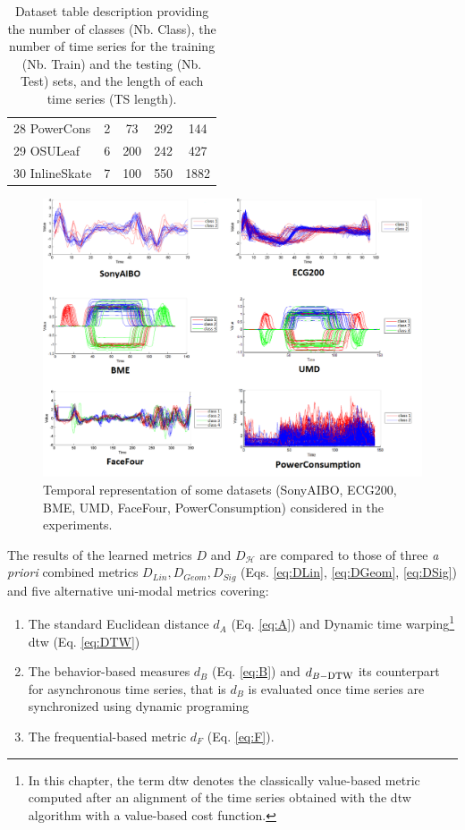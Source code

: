 \begin{table}[h!]
\begin{center}
{\begin{tabular}{lcccc}
				28 PowerCons		& 2 & 73  & 292  & 144 \\						
				29 OSULeaf			& 6 & 200 & 242  & 427 \\
				30 InlineSkate		& 7 & 100 & 550  & 1882\\	    
				\hline
			\end{tabular}
		}
	\end{center}
	\caption{Dataset table description providing the number of classes (Nb. Class), the number of time series for the training (Nb. Train) and the testing (Nb. Test) sets, and the length of each time series (TS length).}
	\label{tab:DatasetDescription}
\end{table}

\begin{figure}[h!]
	\centering
	\includegraphics[width=0.95\linewidth]{images/dataset_exp}
	\caption{Temporal representation of some datasets (SonyAIBO, ECG200, BME, UMD, FaceFour, PowerConsumption) considered in the experiments.}
	\label{fig:dataset}
\end{figure}

\noindent The results of the learned metrics $D$ and $D_{\mathcal{H}}$ are compared to those of three \textit{a priori} combined metrics $D_{Lin}, D_{Geom}, D_{Sig}$ (Eqs. \ref{eq:DLin}, \ref{eq:DGeom}, \ref{eq:DSig}) and five alternative uni-modal metrics covering: 
\begin{enumerate}
	\item The standard  Euclidean distance $d_A$ (Eq. \ref{eq:A}) and Dynamic time warping\footnote{In this chapter, the term {\sc dtw} denotes the classically value-based metric computed after an alignment of the time series obtained with the {\sc dtw} algorithm with a value-based cost function.} {\sc dtw} (Eq. \ref{eq:DTW})
	\item The behavior-based measures  $d_B$ (Eq. \ref{eq:B}) and $d_{B-\mbox{\sc dtw}}$ its counterpart  for asynchronous time series, that is $d_B$ is evaluated once time series are synchronized using dynamic programing
	\item The frequential-based metric  $d_F$ (Eq. \ref{eq:F}). 
\end{enumerate}

